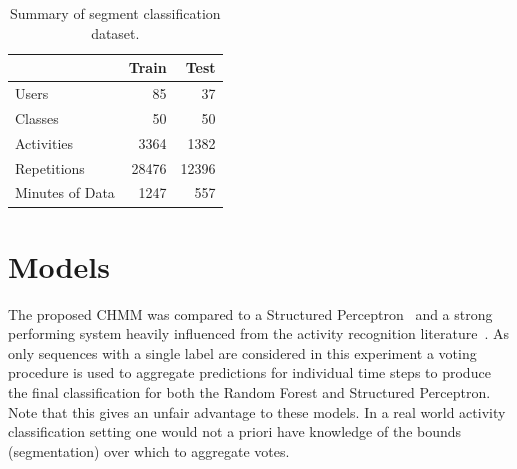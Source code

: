 \documentclass[12pt]{report}
\newcommand{\1}[0]{\mathbbm{1}}
\begin{document}
\begin{table}[ht]
    \centering
    \begin{tabular}{l r r}\hline
    & \textbf{Train} &\textbf{Test} \\\hline
    Users & 85 & 37\\
    Classes & 50 & 50\\
    Activities & 3364 & 1382\\
    Repetitions & 28476 & 12396\\
    Minutes of Data & 1247 & 557\\
    \end{tabular}
    \caption[Summary of segment classification dataset]{
        Summary of segment classification dataset.
    }
    \label{table:segment-dataset}
\end{table}

\section{Models}
The proposed \ac{CHMM} was compared to a Structured Perceptron~\cite{perceptron-collins}
and a strong performing system heavily influenced from the activity recognition literature~\cite{ms-activity}.
As only sequences with a single label are considered in this experiment a voting procedure is used
to aggregate predictions for individual time steps to produce the final classification for both
the Random Forest and Structured Perceptron. Note that this gives an unfair advantage to these
models. In a real world activity classification setting one would not a priori have knowledge of
the bounds (segmentation) over which to aggregate votes.
\end{document}
